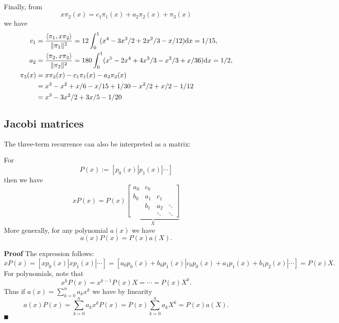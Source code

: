 \begin{example}
\begin{align*}
\end{align*}
Finally, from
\[
x \ensuremath{\pi}_2(x) = c_1 \ensuremath{\pi}_1(x) + a_2 \ensuremath{\pi}_2(x) +  \ensuremath{\pi}_3(x)
\]
we have
\begin{align*}
c_1 &= {\ensuremath{\langle}\ensuremath{\pi}_1,x \ensuremath{\pi}_2\ensuremath{\rangle}  \over \|\ensuremath{\pi}_1\|^2} = 12 \ensuremath{\int}_0^1 (x^4 - 3x^3/2 +2x^2/3 -x/12)  {\rm d} x = 1/15, \\
a_2 &= {\ensuremath{\langle}\ensuremath{\pi}_2,x \ensuremath{\pi}_2\ensuremath{\rangle}  \over \|\ensuremath{\pi}_2\|^2} = 180 \ensuremath{\int}_0^1 (x^5 - 2x^4 +4x^3/3 - x^2/3 + x/36) {\rm d} x = 1/2, \\
\ensuremath{\pi}_3(x) &= x \ensuremath{\pi}_2(x) - c_1 \ensuremath{\pi}_1(x)- a_2 \ensuremath{\pi}_2(x) \ccr 
= x^3 - x^2 + x/6 - x/15 + 1/30 -x^2/2 + x/2 - 1/12 \\
&= x^3 - 3x^2/2 + 3x/5 -1/20
\end{align*}
\end{example}

\subsection{Jacobi matrices}
The three-term recurrence can also be interpreted as a matrix:

\begin{corollary} For
\[
P(x) := [p_0(x) | p_1(x) | \ensuremath{\cdots}]
\]
then we have
\[
x P(x) = P(x) \underbrace{\begin{bmatrix} a_0 & c_0 \\
                                                        b_0 & a_1 & c_1\\
                                                        & b_1 & a_2 & \ensuremath{\ddots} \\
                                                        && \ensuremath{\ddots} & \ensuremath{\ddots}
                                                        \end{bmatrix}}_X
\]
More generally, for any polynomial $a(x)$ we have
\[
a(x) P(x) = P(x) a(X).
\]
\end{corollary}
\textbf{Proof} The expression follows:
\[
x P(x) = [xp_0(x) | xp_1(x) | \ensuremath{\cdots}] =
[a_0p_0(x) + b_0 p_1(x) | c_0 p_0(x) + a_1 p_1(x) + b_1 p_2(x) | \ensuremath{\cdots}] = P(x) X.
\]
For polynomials, note that
\[
x^k P(x) = x^{k-1} P(x) X = \ensuremath{\cdots} = P(x) X^k.
\]
Thus if $a(x) = \ensuremath{\sum}_{k=0}^n a_k x^k$ we have by linearity
\[
a(x) P(x) = \ensuremath{\sum}_{k=0}^n a_k x^k P(x) = P(x) \ensuremath{\sum}_{k=0}^n a_k X^k = P(x) a(X).
\]
\ensuremath{\QED}

